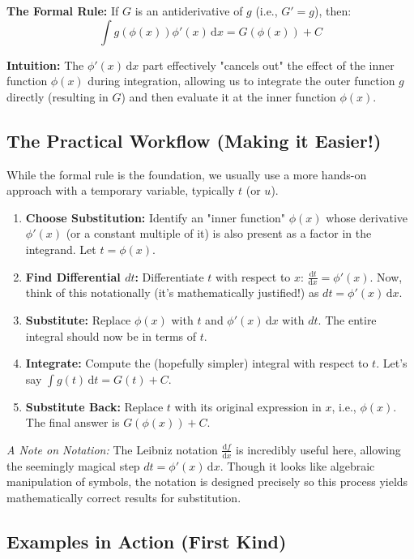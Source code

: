 \documentclass[11pt]{article}
\newcommand{\dx}{\,\mathrm{d}x} %
\newcommand{\dt}{\,\mathrm{d}t} %
\newcommand{\ddx}[1]{\frac{\mathrm{d}#1}{\mathrm{d}x}} %
\begin{document}
\textbf{The Formal Rule:} If $G$ is an antiderivative of $g$ (i.e., $G'=g$), then:
\[ \int g(\phi(x)) \phi'(x) \dx = G(\phi(x)) + C \]

\textbf{Intuition:} The $\phi'(x) \dx$ part effectively "cancels out" the effect of the inner function $\phi(x)$ during integration, allowing us to integrate the outer function $g$ directly (resulting in $G$) and then evaluate it at the inner function $\phi(x)$.

\subsection{The Practical Workflow (Making it Easier!)}

While the formal rule is the foundation, we usually use a more hands-on approach with a temporary variable, typically $t$ (or $u$).

\begin{enumerate}
    \item \textbf{Choose Substitution:} Identify an "inner function" $\phi(x)$ whose derivative $\phi'(x)$ (or a constant multiple of it) is also present as a factor in the integrand. Let $t = \phi(x)$.
    \item \textbf{Find Differential $dt$:} Differentiate $t$ with respect to $x$: $\ddx{t} = \phi'(x)$. Now, think of this notationally (it's mathematically justified!) as $dt = \phi'(x) \dx$.
    \item \textbf{Substitute:} Replace $\phi(x)$ with $t$ and $\phi'(x) \dx$ with $dt$. The entire integral should now be in terms of $t$.
    \item \textbf{Integrate:} Compute the (hopefully simpler) integral with respect to $t$. Let's say $\int g(t) \dt = G(t) + C$.
    \item \textbf{Substitute Back:} Replace $t$ with its original expression in $x$, i.e., $\phi(x)$. The final answer is $G(\phi(x)) + C$.
\end{enumerate}

\textit{A Note on Notation:} The Leibniz notation $\ddx{f}$ is incredibly useful here, allowing the seemingly magical step $dt = \phi'(x) \dx$. Though it looks like algebraic manipulation of symbols, the notation is designed precisely so this process yields mathematically correct results for substitution.

\subsection{Examples in Action (First Kind)}
\end{document}
